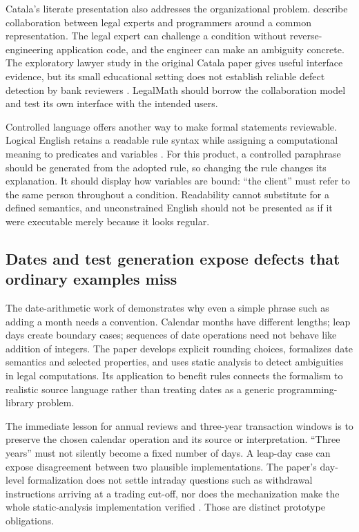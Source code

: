 Catala's literate presentation also addresses the organizational problem.
\citet[sec.~4.2]{huttner2022} describe collaboration between legal experts and
programmers around a common representation. The legal expert can challenge a
condition without reverse-engineering application code, and the engineer can
make an ambiguity concrete. The exploratory lawyer study in the original Catala
paper gives useful interface evidence, but its small educational setting does
not establish reliable defect detection by bank reviewers
\citep[sec.~6]{catala2021}. LegalMath should borrow the collaboration model and
test its own interface with the intended users.

Controlled language offers another way to make formal statements reviewable.
Logical English retains a readable rule syntax while assigning a computational
meaning to predicates and variables \citep{logicalenglish2023}. For this product,
a controlled paraphrase should be generated from the adopted rule, so changing
the rule changes its explanation. It should display how variables are bound:
``the client'' must refer to the same person throughout a condition. Readability
cannot substitute for a defined semantics, and unconstrained English should not
be presented as if it were executable merely because it looks regular.

\subsection{Dates and test generation expose defects that ordinary examples miss}

The date-arithmetic work of \citet{dates2024} demonstrates why even a simple phrase
such as adding a month needs a convention. Calendar months have different
lengths; leap days create boundary cases; sequences of date operations need not
behave like addition of integers. The paper develops explicit rounding choices,
formalizes date semantics and selected properties, and uses static analysis to
detect ambiguities in legal computations. Its application to benefit rules
connects the formalism to realistic source language rather than treating dates
as a generic programming-library problem.

The immediate lesson for annual reviews and three-year transaction windows is
to preserve the chosen calendar operation and its source or interpretation.
``Three years'' must not silently become a fixed number of days. A leap-day case
can expose disagreement between two plausible implementations. The paper's
day-level formalization does not settle intraday questions such as withdrawal
instructions arriving at a trading cut-off, nor does the mechanization make the
whole static-analysis implementation verified
\citep[secs.~2--6]{dates2024}. Those are distinct prototype obligations.


